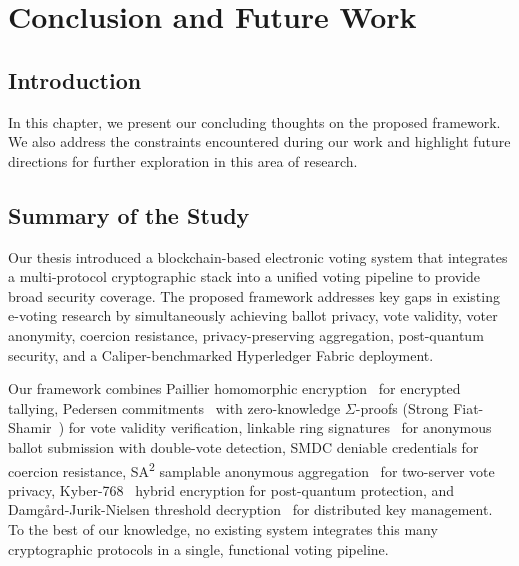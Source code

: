 \chapter{Conclusion and Future Work}
\label{ch:conclusion}

\section{Introduction}
\label{sec:conc-intro}

In this chapter, we present our concluding thoughts on the proposed framework. We also address the constraints encountered during our work and highlight future directions for further exploration in this area of research.

\section{Summary of the Study}
\label{sec:summary}

Our thesis introduced a blockchain-based electronic voting system that integrates a multi-protocol cryptographic stack into a unified voting pipeline to provide broad security coverage. The proposed framework addresses key gaps in existing e-voting research by simultaneously achieving ballot privacy, vote validity, voter anonymity, coercion resistance, privacy-preserving aggregation, post-quantum security, and a Caliper-benchmarked Hyperledger Fabric deployment.

Our framework combines Paillier homomorphic encryption~\cite{paillier1999} for encrypted tallying, Pedersen commitments~\cite{pedersen1991} with zero-knowledge $\Sigma$-proofs (Strong Fiat-Shamir~\cite{bernhard2012}) for vote validity verification, linkable ring signatures~\cite{liu2004} for anonymous ballot submission with double-vote detection, SMDC deniable credentials for coercion resistance, SA\textsuperscript{2} samplable anonymous aggregation~\cite{sa2_apple} for two-server vote privacy, Kyber-768~\cite{nist_kyber} hybrid encryption for post-quantum protection, and Damg\aa rd-Jurik-Nielsen threshold decryption~\cite{damgard2010} for distributed key management. To the best of our knowledge, no existing system integrates this many cryptographic protocols in a single, functional voting pipeline.

